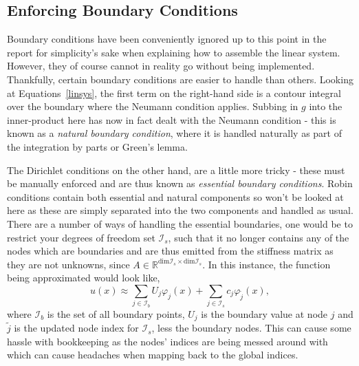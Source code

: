 \subsection{Enforcing Boundary Conditions}\label{boundaries}

Boundary conditions have been conveniently ignored up to this point in the report for simplicity's sake when explaining how to assemble the linear system. However, they of course cannot in reality go without being implemented. Thankfully, certain boundary conditions are easier to handle than others. Looking at Equations~\eqref{linsys}, the first term on the right-hand side is a contour integral over the boundary where the Neumann condition applies. Subbing in $g$ into the inner-product here has now in fact dealt with the Neumann condition - this is known as a \textit{natural boundary condition}, where it is handled naturally as part of the integration by parts or Green's lemma.

The Dirichlet conditions on the other hand, are a little more tricky - these must be manually enforced and are thus known as \textit{essential boundary conditions}. Robin conditions contain both essential and natural components so won't be looked at here as these are simply separated into the two components and handled as usual. There are a number of ways of handling the essential boundaries, one would be to restrict your degrees of freedom set $\mathcal{I}_s$, such that it no longer contains any of the nodes which are boundaries and are thus emitted from the stiffness matrix as they are not unknowns, since $A \in \mathbb{R}^{\text{dim} \mathcal{I}_s \times \text{dim}\mathcal{I}_s}$. In this instance, the function being approximated would look like,
\begin{equation}
	u(x) \approx \sum_{j\in\mathcal{I}_b}U_j\varphi_j(x) + \sum_{j\in\mathcal{I}_s}c_j \varphi_{\widetilde j}(x),
\end{equation}
where $\mathcal{I}_b$ is the set of all boundary points, $U_j$ is the boundary value at node $j$ and $\widetilde{j}$ is the updated node index for $\mathcal{I}_s$, less the boundary nodes. This can cause some hassle with bookkeeping as the nodes' indices are being messed around with which can cause headaches when mapping back to the global indices.

